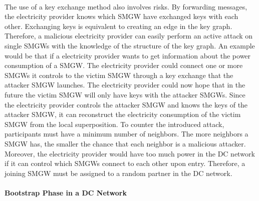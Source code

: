 \\The use of a key exchange method also involves risks. By forwarding messages, the electricity provider knows which \gls{SMGW} have exchanged keys with each other. Exchanging keys is equivalent to creating an edge in the key graph. %
Therefore, a malicious electricity provider can easily perform an active attack on single \gls{SMGW}s with the knowledge of the structure of the key graph. %
An example would be that if a electricity provider wants to get information about the power consumption of a \gls{SMGW}. The electricity provider could connect one or more \gls{SMGW}s it controls to the victim \gls{SMGW} through a key exchange that the attacker \gls{SMGW} launches. The electricity provider could now hope that in the future the victim \gls{SMGW} will only have keys with the attacker \gls{SMGW}s. Since the electricity provider controls the attacker \gls{SMGW} and knows the keys of the attacker \gls{SMGW}, it can reconstruct the electricity consumption of the victim \gls{SMGW} from the local superposition. To counter the introduced attack, participants must have a minimum number of neighbors. The more neighbors a \gls{SMGW} has, the smaller the chance that each neighbor is a malicious attacker. Moreover, the electricity provider would have too much power in the DC network if it can control which \gls{SMGW}s connect to each other upon entry. Therefore, a joining \gls{SMGW} must be assigned to a random partner in the DC network.\\ %
\\
\textbf{Bootstrap Phase in a DC Network}
\\
\\
